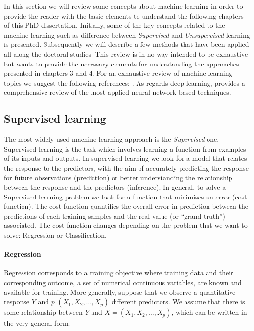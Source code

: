 In this section we will review some concepts about machine learning in order to provide the reader with the basic elements to understand the following chapters of this PhD dissertation. Initially, some of the key concepts related to the machine learning such as difference between \textit{Supervised} and \textit{Unsupervised} learning is presented. Subsequently we will describe a few methods that have been applied all along the doctoral studies. This review is in no way intended to be exhaustive but wants to provide the necessary elements for understanding the approaches presented in chapters 3 and 4. For an exhaustive review of machine learning topics we suggest the following references: \citep{bishop2006pattern,friedman2017elements}. As regards deep learning, \citep{goodfellow2016deep} provides a comprehensive review of the most applied neural network based techniques. 


\subsection{Supervised learning}

The most widely used machine learning approach is the \textit{Supervised} one. Supervised learning is the task which involves learning a function from examples of its inputs and outputs. In supervised learning we look for a model that relates the response to the predictors, with the aim of accurately predicting the response for future observations (prediction) or better understanding the relationship between the response and the predictors (inference). In general, to solve a Supervised learning problem we look for a function that minimises an error (cost function). The cost function quantifies the overall error in prediction between the predictions of each training samples and the real value (or “grand-truth”) associated. The cost function changes depending on the problem that we want to solve: Regression or Classification.

\paragraph{Regression} \label{Regression}

Regression corresponds to a training objective where training data and their corresponding outcome, a set of numerical continuous variables, are known and available for training. More generally, suppose that we observe a quantitative response $Y$ and $p$ $(X_1,X_2,\ldots,X_p)$ different predictors. We assume that there is some relationship between $Y$ and $X = (X_1,X_2,\ldots,X_p)$, which can be written in the very general form: 

